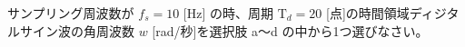 サンプリング周波数が $f_s = 10$ [Hz] の時、周期 $\textrm{T}_d = 20$ [点]の時間領域ディジタルサイン波の角周波数 $w$ [rad/秒]を選択肢 a〜d の中から1つ選びなさい。
